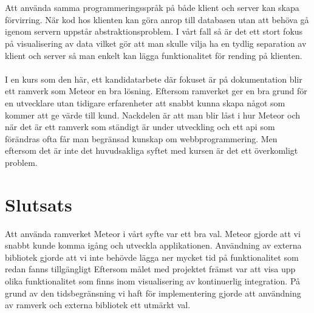\\ \\
Att använda samma programmeringsspråk på både klient och server kan skapa förvirring. När kod hos klienten kan göra anrop till databasen utan att behöva gå igenom servern uppstår abstraktionsproblem. I vårt fall så är det ett stort fokus på visualisering av data vilket gör att man skulle vilja ha en tydlig separation av klient och server så man enkelt kan lägga funktionalitet för rending på klienten.
\\ \\
I en kurs som den här, ett kandidatarbete där fokuset är på dokumentation blir ett ramverk som Meteor en bra lösning. Eftersom ramverket ger en bra grund för en utvecklare utan tidigare erfarenheter att snabbt kunna skapa något som kommer att ge värde till kund. Nackdelen är att man blir låst i hur Meteor och när det är ett ramverk som ständigt är under utveckling och ett api som förändras ofta får man begränsad kunskap om webbprogrammering. Men eftersom det är inte det huvudsakliga syftet med kursen är det ett överkomligt problem.
\section{Slutsats}
\label{subsec:johan_t-slutsats}
Att använda ramverket Meteor i vårt syfte var ett bra val. Meteor gjorde att vi snabbt kunde komma igång och utveckla applikationen. Användning av externa bibliotek gjorde att vi inte behövde lägga ner mycket tid på funktionalitet som redan fanns tillgängligt Eftersom målet med projektet främst var att visa upp olika funktionalitet som finns inom visualisering av kontinuerlig integration. På grund av den tidsbegränsning vi haft för implementering gjorde att användning av ramverk och externa bibliotek ett utmärkt val.